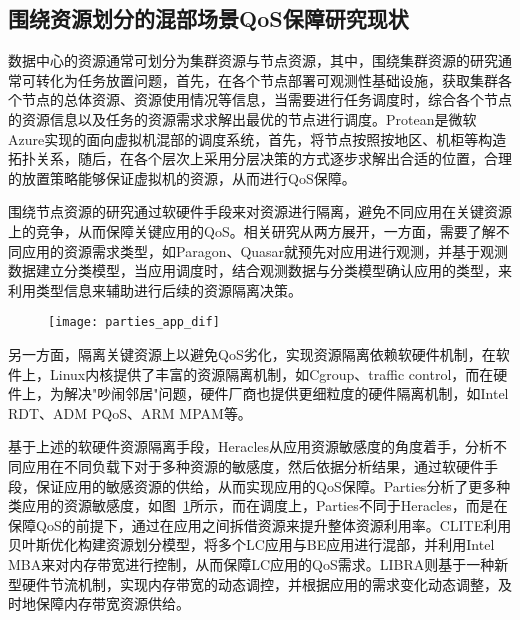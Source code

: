 \subsection{围绕资源划分的混部场景QoS保障研究现状}


数据中心的资源通常可划分为集群资源与节点资源，其中，围绕集群资源的研究通常可转化为任务放置问题，首先，在各个节点部署可观测性基础设施，获取集群各个节点的总体资源、资源使用情况等信息，当需要进行任务调度时，综合各个节点的资源信息以及任务的资源需求求解出最优的节点进行调度。Protean\citep{hadary2020protean}是微软Azure实现的面向虚拟机混部的调度系统，首先，将节点按照按地区、机柜等构造拓扑关系，随后，在各个层次上采用分层决策的方式逐步求解出合适的位置，合理的放置策略能够保证虚拟机的资源，从而进行QoS保障。

围绕节点资源的研究通过软硬件手段来对资源进行隔离，避免不同应用在关键资源上的竞争，从而保障关键应用的QoS。相关研究从两方展开，一方面，需要了解不同应用的资源需求类型，如Paragon\citep{delimitrou2013paragon}、Quasar\citep{delimitrou2014quasar}就预先对应用进行观测，并基于观测数据建立分类模型，当应用调度时，结合观测数据与分类模型确认应用的类型，来利用类型信息来辅助进行后续的资源隔离决策。

\begin{figure}[!htbp]
    \centering
    \texttt{[image: parties\_app\_dif]}
    \label{fig:parties_app_dif}
\end{figure}

另一方面，隔离关键资源上以避免QoS劣化，实现资源隔离依赖软硬件机制，在软件上，Linux内核提供了丰富的资源隔离机制，如Cgroup、traffic control，而在硬件上，为解决"吵闹邻居"问题\citep{xu2018dcat, maricq2018taming, rzadca2020autopilot, kwon2020dc}，硬件厂商也提供更细粒度的硬件隔离机制，如Intel RDT、ADM PQoS\citep{amdpqos}、ARM MPAM\citep{armmpam}等。

基于上述的软硬件资源隔离手段，Heracles\citep{lo2015heracles}从应用资源敏感度的角度着手，分析不同应用在不同负载下对于多种资源的敏感度，然后依据分析结果，通过软硬件手段，保证应用的敏感资源的供给，从而实现应用的QoS保障。Parties\citep{chen2019parties}分析了更多种类应用的资源敏感度，如图~\ref{fig:parties_app_dif}所示，而在调度上，Parties不同于Heracles，而是在保障QoS的前提下，通过在应用之间拆借资源来提升整体资源利用率。CLITE\citep{patel2020clite}利用贝叶斯优化构建资源划分模型，将多个LC应用与BE应用进行混部，并利用Intel MBA来对内存带宽进行控制，从而保障LC应用的QoS需求。LIBRA\citep{zhang2021libra}则基于一种新型硬件节流机制，实现内存带宽的动态调控，并根据应用的需求变化动态调整，及时地保障内存带宽资源供给。

